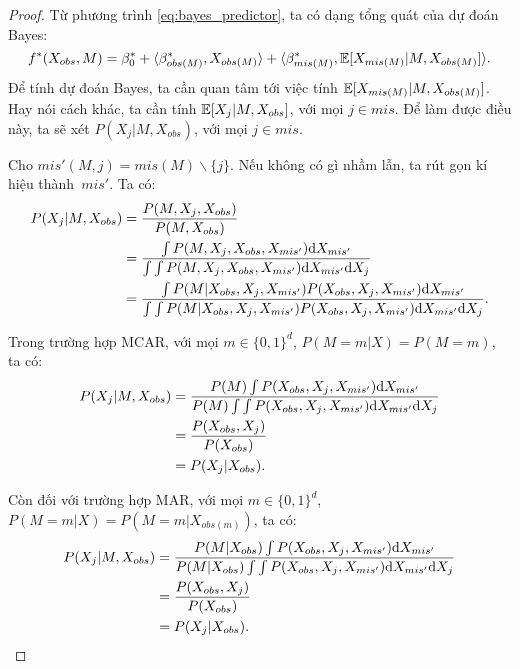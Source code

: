 \begin{proof}
    Từ phương trình \eqref{eq:bayes_predictor}, ta có dạng tổng quát của dự đoán Bayes:
    \begin{equation*}
        f^* (X_{obs}, M) = \beta_{0}^{*} + \langle\beta_{obs(M)}^{*}, X_{obs(M)}\rangle 
        + \langle\beta_{mis(M)}^{*}, \mathbb{E} [X_{mis(M)} | M, X_{obs(M)}] \rangle.
    \end{equation*}
    Để tính dự đoán Bayes, ta cần quan tâm tới việc tính $\mathbb{E} [X_{mis(M)} | M, X_{obs(M)}]$. Hay nói cách khác, ta cần tính $\mathbb{E}[X_j | M, X_{obs}]$, với mọi $j \in mis$. Để làm được điều này, ta sẽ xét $P(X_j | M, X_{obs})$, với mọi $j \in mis$.

    Cho $mis'(M, j) = mis(M) \backslash \{j\}$. Nếu không có gì nhầm lẫn, ta rút gọn kí hiệu thành~$mis'$. Ta có:
    \begin{align}
            P(X_j|M, X_{obs}) &= \dfrac{P(M, X_j, X_{obs})}{P(M, X_{obs})} \notag \\
            &= \dfrac{\int P(M, X_j, X_{obs}, X_{mis'}) \mathrm{d} X_{mis'}}{\int \int P(M, X_j, X_{obs}, X_{mis'}) \mathrm{d} X_{mis'} \mathrm{d} X_j} \notag \\
            &= \dfrac{\int P(M | X_{obs}, X_j, X_{mis'}) P(X_{obs}, X_j, X_{mis'}) \mathrm{d} X_{mis'}}{\int \int P(M | X_{obs}, X_j, X_{mis'}) P(X_{obs}, X_j, X_{mis'}) \mathrm{d} X_{mis'} \mathrm{d} X_j}. \label{eq:PX_conditional_general}
    \end{align}

    Trong trường hợp MCAR, với mọi $m \in \{0, 1\}^d$, $P(M = m | X) = P(M = m)$, ta có:
    \begin{align*}
        P(X_j|M, X_{obs}) &= 
        \dfrac{ P(M) \int P(X_{obs}, X_j, X_{mis'}) \mathrm{d} X_{mis'}}{P(M) \int \int P(X_{obs}, X_j, X_{mis'}) \mathrm{d} X_{mis'} \mathrm{d} X_j} \\
        &= \dfrac{P(X_{obs}, X_j)}{P(X_{obs})} \\
        &= P(X_j | X_{obs}). 
    \end{align*}

    Còn đối với trường hợp MAR, với mọi $m \in \{0, 1\}^d$, $P(M = m | X) = P(M = m | X_{obs(m)})$, ta có:
    \begin{align*}
        P(X_j|M, X_{obs}) &= 
        \dfrac{ P(M|X_{obs}) \int P(X_{obs}, X_j, X_{mis'}) \mathrm{d} X_{mis'}}{P(M|X_{obs}) \int \int P(X_{obs}, X_j, X_{mis'}) \mathrm{d} X_{mis'} \mathrm{d} X_j} \\
        &= \dfrac{P(X_{obs}, X_j)}{P(X_{obs})} \\
        &= P(X_j | X_{obs}). 
    \end{align*}
    

\end{proof}
